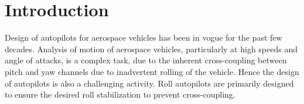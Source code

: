 \documentclass[conference]{IEEEtran}
\begin{document}
%
%
\begin{center}
\end{center}
%
\section{Introduction}
%

Design of autopilots for aerospace vehicles has been in vogue for the past few decades. Analysis of motion of aerospace vehicles, particularly at high speeds and angle of attacks, is a complex task, due to the inherent cross-coupling between pitch and yaw channels due to inadvertent rolling of the vehicle. Hence the design of autopilots is also a challenging activity. Roll autopilots are primarily designed to ensure the desired roll stabilization to prevent cross-coupling.
\end{document}
